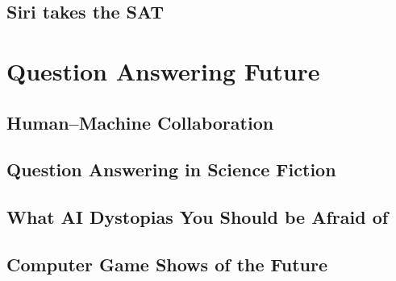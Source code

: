 \documentclass[bfivepaper,twosided,justified,nobib]{style/tufte-book}
\newif\ifproposal\proposalfalse
\newcommand{\proposalpart}[1]{
  \ifproposal
  \subsection{#1}
  \else
  \part{#1}
  \fi
}
\newcommand{\chapterfile}[3]{
  \ifproposal
    \stepcounter{chapter}
    \label{ch:#2}
  \paragraph{#3}
  
  \else
  \chapter{#3}
  \label{ch:#2}
  \begin{quote}
    
  \end{quote}
  
  \fi}
\begin{document}
\chapterfile{280}{leaderboards}{Siri takes the SAT}







\proposalpart{Question Answering Future}

\chapterfile{300}{datasets_adversarial}{Human--Machine Collaboration}

\chapterfile{310}{sci_fi}{Question Answering in Science Fiction}

\chapterfile{330}{fear_of_a_bot_planet}{What AI Dystopias You Should
  be Afraid of}




\chapterfile{340}{gameshow}{Computer Game Shows of the Future}


\ifproposal

  
  \chapter{Watson on Jeopardy!: \\ Unquestioned Answers from \abr{ibm}'s tour
    de force \\ (Sample Chapter)}
  
  \begin{quote}
    
  \end{quote}
  
  
\fi

\backmatter





\printindex
\end{document}
